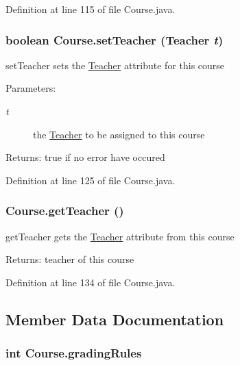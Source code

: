 Definition at line 115 of file Course.java.\hypertarget{classCourse_678a0261fead39c7bfca06b0e69fc419}{
\subsubsection{\setlength{\rightskip}{0pt plus 5cm}boolean Course.setTeacher ({\bf Teacher} {\em t})}}
\label{classCourse_678a0261fead39c7bfca06b0e69fc419}


setTeacher sets the \hyperlink{classTeacher}{Teacher} attribute for this course 

\begin{Desc}
\item[Parameters:]
\begin{description}
\item[{\em t}]the \hyperlink{classTeacher}{Teacher} to be assigned to this course \end{description}
\end{Desc}
\begin{Desc}
\item[Returns:]true if no error have occured \end{Desc}


Definition at line 125 of file Course.java.\hypertarget{classCourse_4bd27c4b74ec54cc76d13d9bb05f2e58}{
\subsubsection{ Course.getTeacher ()}}
\label{classCourse_4bd27c4b74ec54cc76d13d9bb05f2e58}


getTeacher gets the \hyperlink{classTeacher}{Teacher} attribute from this course 

\begin{Desc}
\item[Returns:]teacher of this course \end{Desc}


Definition at line 134 of file Course.java.

\subsection{Member Data Documentation}
\hypertarget{classCourse_98c195c6fb24d3516cce208d316cfea7}{
\subsubsection{\setlength{\rightskip}{0pt plus 5cm}int {\bf Course.gradingRules}}}
\label{classCourse_98c195c6fb24d3516cce208d316cfea7}


